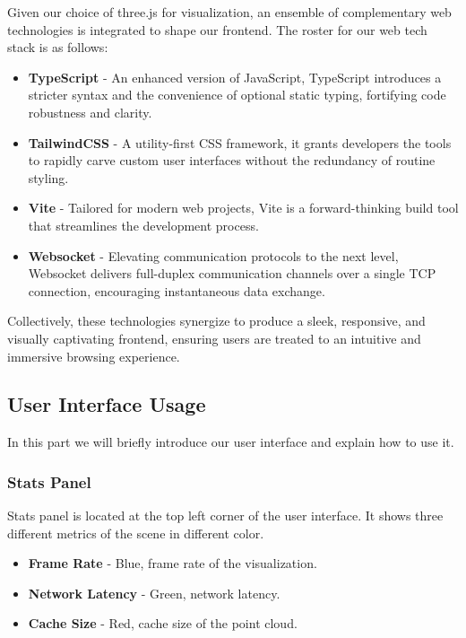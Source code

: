 \documentclass[11pt, a4paper,oneside,chapterprefix=false]{scrbook}
\begin{document}
Given our choice of three.js for visualization, an ensemble of complementary web technologies is integrated to shape our frontend. The roster for our web tech stack is as follows:

\begin{itemize}
	\item \textbf{TypeScript} - An enhanced version of JavaScript, TypeScript introduces a stricter syntax and the convenience of optional static typing, fortifying code robustness and clarity.
	
	\item \textbf{TailwindCSS} - A utility-first CSS framework, it grants developers the tools to rapidly carve custom user interfaces without the redundancy of routine styling.
	
	\item \textbf{Vite} - Tailored for modern web projects, Vite is a forward-thinking build tool that streamlines the development process.
	
	\item \textbf{Websocket} - Elevating communication protocols to the next level, Websocket delivers full-duplex communication channels over a single TCP connection, encouraging instantaneous data exchange.
\end{itemize}

Collectively, these technologies synergize to produce a sleek, responsive, and visually captivating frontend, ensuring users are treated to an intuitive and immersive browsing experience.

\subsection{User Interface Usage}

In this part we will briefly introduce our user interface and explain how to use it.

\subsubsection{Stats Panel}

Stats panel is located at the top left corner of the user interface. It shows three different metrics of the scene in different color.

\begin{itemize}
	\item \textbf{Frame Rate} - Blue, frame rate of the visualization.
	\item \textbf{Network Latency} - Green, network latency.
	\item \textbf{Cache Size} - Red, cache size of the point cloud.
\end{itemize}
\end{document}
